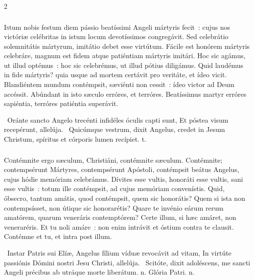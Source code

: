 \documentclass[9pt,twoside]{extarticle}
\begin{document}
\begin{multicols}{2}
{{\subsubsection*{\center {}}
\lettrine{I}stum nobis festum diem pássio beatíssimi Angeli mártyris fecit~: cujus nos victóriæ celébritas in istum locum devotíssimos congregávit. Sed celebrátio solemnitátis mártyrum, imitátio debet esse virtútum. Fácile est honórem mártyris celebráre, magnum est fidem atque patiéntiam mártyris imitári. Hoc sic agámus, ut illud optémus~: hoc sic celebrémus, ut illud pótius diligámus. Quid laudémus in fide mártyris? quia usque ad mortem certávit pro veritáte, et ídeo vicit. Blandiéntem mundum contémpsit, sæviénti non cessit~: ídeo victor ad Deum accéssit. Abúndant in isto sæculo erróres, et terróres. Beatíssimus martyr erróres sapiéntia, terróres patiéntia superávit.

\begin{tightlist}{}
\item {}~Oránte sancto Angelo trecénti infidéles óculis capti sunt, \textred{*} Et póstea visum recepérunt, allelúja. ~Quicúmque vestrum, dixit Angelus, credet in Jesum Christum, spíritus et córporis lumen recípiet. t.
\end{tightlist}

\subsubsection*{\center {}}
\lettrine{C}ontémnite ergo sæculum, Christiáni, contémnite sæculum. Contémnite; contempsérunt Mártyres, contempsérunt Apóstoli, contémpsit beátus Angelus, cujus hódie memóriam celebrámus. Dívites esse vultis, honoráti esse vultis, sani esse vultis~: totum ille contémpsit, ad cujus memóriam convenístis. Quid, óbsecro, tantum amátis, quod contémpsit, quem sic honorátis? Quem si ista non contempsísset, non útique sic honorarétis? Quare te invénio eárum rerum amatórem, quarum veneráris contemptórem? Certe illum, si hæc amáret, non veneraréris. Et tu noli amáre~: non enim intrávit et óstium contra te clausit. Contémne et tu, et intra post illum.

\begin{tightlist}{}
\item {}~Instar Patris sui Elíæ, Angelus fílium víduæ revocávit ad vitam, \textred{*} In virtúte passiónis Dómini nostri Jesu Christi, allelúja. ~Scitóte, dixit adoléscens, me sancti Angeli précibus ab utráque morte liberátum. n. Glória Patri. n.
\end{tightlist}

}}
\end{multicols}
\end{document}
